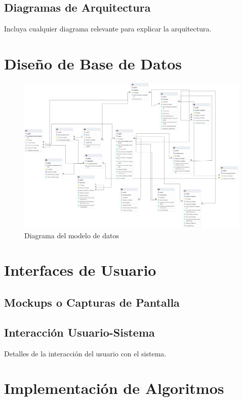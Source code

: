 \subsection{Diagramas de Arquitectura}
Incluya cualquier diagrama relevante para explicar la arquitectura.

\section{Diseño de Base de Datos}


\newpage

\begin{figure}[H]
    \centering
    \begin{sideways}
        \includegraphics[width=1.8\textwidth]{imagenes/er.png}
    \end{sideways}
    \caption{Diagrama del modelo de datos}
    \label{fig:modeladodedatos}
\end{figure}

\section{Interfaces de Usuario}
\subsection{Mockups o Capturas de Pantalla}
\subsection{Interacción Usuario-Sistema}
Detalles de la interacción del usuario con el sistema.

\section{Implementación de Algoritmos}
